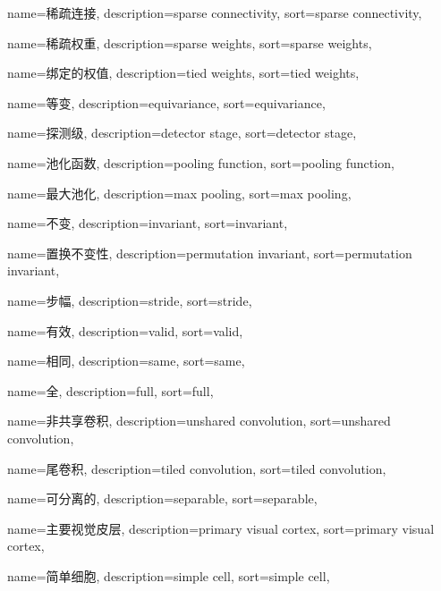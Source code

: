 {
  name=稀疏连接,
  description={sparse connectivity},
  sort={sparse connectivity},
}

{
  name=稀疏权重,
  description={sparse weights},
  sort={sparse weights},
}

{
  name=绑定的权值,
  description={tied weights},
  sort={tied weights},
}

{
  name=等变,
  description={equivariance},
  sort={equivariance},
}

{
  name=探测级,
  description={detector stage},
  sort={detector stage},
}

{
  name=池化函数,
  description={pooling function},
  sort={pooling function},
}

{
  name=最大池化,
  description={max pooling},
  sort={max pooling},
}

{
  name=不变,
  description={invariant},
  sort={invariant},
}

{
  name=置换不变性,
  description={permutation invariant},
  sort={permutation invariant},
}

{
  name=步幅,
  description={stride},
  sort={stride},
}

{
  name=有效,
  description={valid},
  sort={valid},
}

{
  name=相同,
  description={same},
  sort={same},
}

{
  name=全,
  description={full},
  sort={full},
}

{
  name=非共享卷积,
  description={unshared convolution},
  sort={unshared convolution},
}

{
  name=尾卷积,
  description={tiled convolution},
  sort={tiled convolution},
}

{
  name=可分离的,
  description={separable},
  sort={separable},
}

{
  name=主要视觉皮层,
  description={primary visual cortex},
  sort={primary visual cortex},
}

{
  name=简单细胞,
  description={simple cell},
  sort={simple cell},
}

